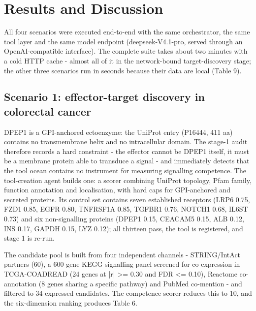 \chapter{Results and Discussion}\label{ch:4}

All four scenarios were executed end-to-end with the same orchestrator, the same tool layer and the same model endpoint (deepseek-V4.1-pro, served through an OpenAI-compatible interface). The complete suite takes about two minutes with a cold HTTP cache - almost all of it in the network-bound target-discovery stage; the other three scenarios run in seconds because their data are local (Table 9).

\section{Scenario 1: effector-target discovery in colorectal cancer}

DPEP1 is a GPI-anchored ectoenzyme: the UniProt entry (P16444, 411 aa) contains no transmembrane helix and no intracellular domain. The stage-1 audit therefore records a hard constraint - the effector cannot be DPEP1 itself, it must be a membrane protein able to transduce a signal - and immediately detects that the tool ocean contains no instrument for measuring signalling competence. The tool-creation agent builds one: a scorer combining UniProt topology, Pfam family, function annotation and localisation, with hard caps for GPI-anchored and secreted proteins. Its control set contains seven established receptors (LRP6 0.75, FZD1 0.85, EGFR 0.80, TNFRSF1A 0.85, TGFBR1 0.76, NOTCH1 0.68, IL6ST 0.73) and six non-signalling proteins (DPEP1 0.15, CEACAM5 0.15, ALB 0.12, INS 0.17, GAPDH 0.15, LYZ 0.12); all thirteen pass, the tool is registered, and stage 1 is re-run.

The candidate pool is built from four independent channels - STRING/IntAct partners (60), a 600-gene KEGG signalling panel screened for co-expression in TCGA-COADREAD (24 genes at |r| >= 0.30 and FDR <= 0.10), Reactome co-annotation (8 genes sharing a specific pathway) and PubMed co-mention - and filtered to 34 expressed candidates. The competence scorer reduces this to 10, and the six-dimension ranking produces Table 6.


